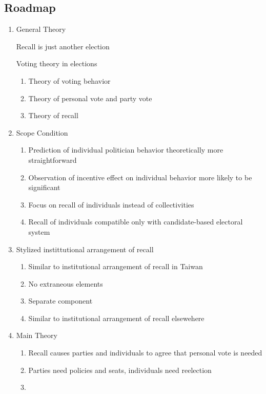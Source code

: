 \documentclass[hyphens, crop=false]{standalone}
\begin{document}
	
	
	
	
	
	\subsection*{Roadmap}
	\begin{enumerate}
		\item 
		General Theory
		
		Recall is just another election
		
		Voting theory in elections
		\begin{enumerate}
			\item 
			Theory of voting behavior
			\item 
			Theory of personal vote and party vote
			\item 
			Theory of recall
		\end{enumerate}
		\item 
		Scope Condition
		\begin{enumerate}
			\item 
			Prediction of individual politician behavior theoretically more straightforward
			\item 
			Observation of incentive effect on individual behavior more likely to be significant
			\item 
			Focus on recall of individuals instead of collectivities
			\item 
			Recall of individuals compatible only with candidate-based electoral system
		\end{enumerate}
		\item 
		Stylized instittutional arrangement of recall
		\begin{enumerate}
			\item 
			Similar to institutional arrangement of recall in Taiwan
			\item 
			No extraneous elements
			\item 
			Separate component
			\item 
			Similar to institutional arrangement of recall elsewehere
		\end{enumerate}
		\item 
		Main Theory
		\begin{enumerate}
			\item 
			Recall causes parties and individuals to agree that personal vote is needed
			\item 
			Parties need policies and seats, individuals need reelection
			\item 

\end{enumerate}
\end{enumerate}
\end{document}
